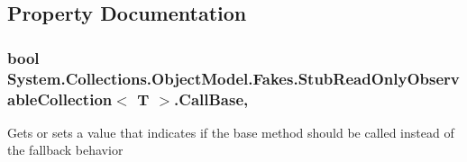 \subsection{Property Documentation}
\hypertarget{class_system_1_1_collections_1_1_object_model_1_1_fakes_1_1_stub_read_only_observable_collection_3_01_t_01_4_abc74d42d723a8534e2254ec52dfc4459}{
\subsubsection[{Call\-Base}]{\setlength{\rightskip}{0pt plus 5cm}bool System.\-Collections.\-Object\-Model.\-Fakes.\-Stub\-Read\-Only\-Observable\-Collection$<$ T $>$.Call\-Base\hspace{0.3cm}{\ttfamily [get]}, {\ttfamily [set]}}}\label{class_system_1_1_collections_1_1_object_model_1_1_fakes_1_1_stub_read_only_observable_collection_3_01_t_01_4_abc74d42d723a8534e2254ec52dfc4459}


Gets or sets a value that indicates if the base method should be called instead of the fallback behavior

